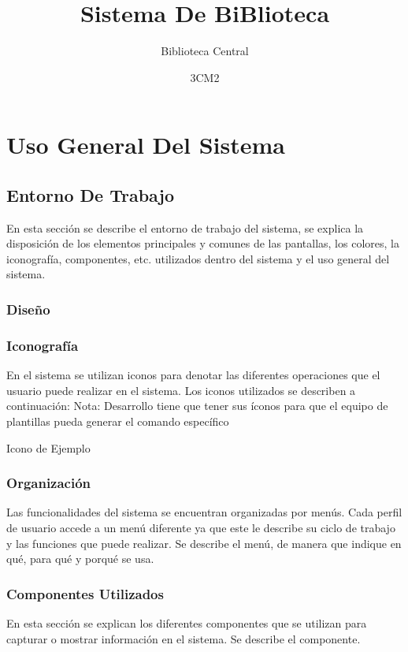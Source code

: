 \documentclass[oneside,10pt]{book}
\title{Sistema De BiBlioteca}
\subtitle{Biblioteca Central}
\author{3CM2}
\begin{document}
\maketitle
\frontmatter
\tableofcontents
\mainmatter
\chapter{Uso General Del Sistema}
\section{Entorno De Trabajo}
En esta sección se describe el entorno de trabajo del sistema, se explica la disposición
de los elementos principales y comunes de las pantallas, los colores, la iconografía, componentes, etc.
utilizados dentro del sistema y el uso general del sistema.
\subsection{Diseño}
\subsection{Iconografía}
En el sistema se utilizan iconos para denotar las diferentes operaciones que el usuario puede realizar
en el sistema. Los iconos utilizados se describen a continuación:
Nota: Desarrollo tiene que tener sus íconos para que el equipo de plantillas pueda generar el comando específico
\begin{Iconography}
	\item \ICexample Icono de Ejemplo
\end{Iconography}
\subsection{Organización}
Las funcionalidades del sistema se encuentran organizadas por menús. Cada perfil de usuario accede
a un menú diferente ya que este le describe su ciclo de trabajo y las funciones que puede realizar.
Se describe el menú, de manera que indique en qué, para qué y porqué se usa.
\subsection{Componentes Utilizados}
En esta sección se explican los diferentes componentes que se utilizan para capturar o mostrar
información en el sistema.
Se describe el componente.
\end{document}
